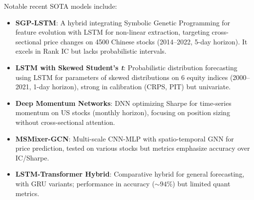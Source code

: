 \documentclass[twoside,final]{hcmut-report}
\begin{document}
\vspace{0.5em}
Notable recent SOTA models include:
\vspace{-0.5em}
\begin{itemize}
  \item \textbf{SGP-LSTM}: A hybrid integrating Symbolic Genetic Programming for feature evolution with LSTM for non-linear extraction, targeting cross-sectional price changes on 4500 Chinese stocks (2014--2022, 5-day horizon). It excels in Rank IC but lacks probabilistic intervals.
  \item \textbf{LSTM with Skewed Student's \emph{t}}: Probabilistic distribution forecasting using LSTM for parameters of skewed distributions on 6 equity indices (2000--2021, 1-day horizon), strong in calibration (CRPS, PIT) but univariate.
  \item \textbf{Deep Momentum Networks}: DNN optimizing Sharpe for time-series momentum on US stocks (monthly horizon), focusing on position sizing without cross-sectional attention.
  \item \textbf{MSMixer-GCN}: Multi-scale CNN-MLP with spatio-temporal GNN for price prediction, tested on various stocks but metrics emphasize accuracy over IC/Sharpe.
  \item \textbf{LSTM-Transformer Hybrid}: Comparative hybrid for general forecasting, with GRU variants; performance in accuracy ($\sim 94\%$) but limited quant metrics.
\end{itemize}
\end{document}
